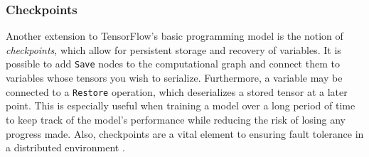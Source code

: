 \subsubsection{Checkpoints}\label{sec:model-ext-check}

Another extension to TensorFlow's basic programming model is the notion of
\emph{checkpoints}, which allow for persistent storage and recovery of
variables. It is possible to add \texttt{Save} nodes to the computational graph
and connect them to variables whose tensors you wish to serialize. Furthermore,
a variable may be connected to a \texttt{Restore} operation, which deserializes
a stored tensor at a later point. This is especially useful when training a
model over a long period of time to keep track of the model's performance while
reducing the risk of losing any progress made. Also, checkpoints are a vital
element to ensuring fault tolerance in a distributed environment
\cite{tensorflow}.

